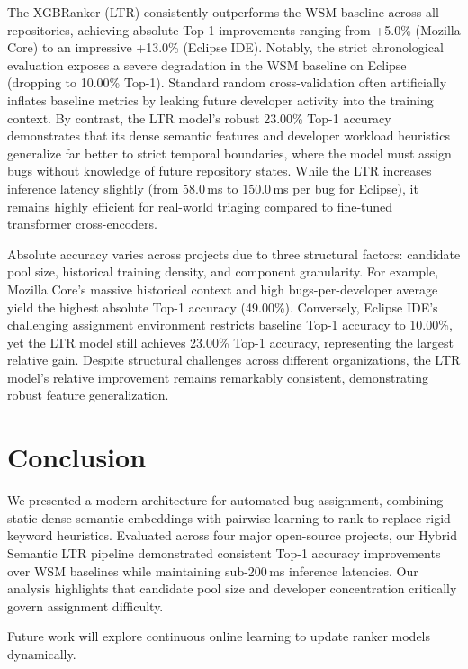 \documentclass[sigconf,review,anonymous]{acmart}
\begin{document}
The XGBRanker (LTR) consistently outperforms the WSM baseline across all repositories, achieving absolute Top-1 improvements ranging from +5.0\% (Mozilla Core) to an impressive +13.0\% (Eclipse IDE). Notably, the strict chronological evaluation exposes a severe degradation in the WSM baseline on Eclipse (dropping to 10.00\% Top-1). Standard random cross-validation often artificially inflates baseline metrics by leaking future developer activity into the training context. By contrast, the LTR model's robust 23.00\% Top-1 accuracy demonstrates that its dense semantic features and developer workload heuristics generalize far better to strict temporal boundaries, where the model must assign bugs without knowledge of future repository states. While the LTR increases inference latency slightly (from 58.0\,ms to 150.0\,ms per bug for Eclipse), it remains highly efficient for real-world triaging compared to fine-tuned transformer cross-encoders.

Absolute accuracy varies across projects due to three structural factors: candidate pool size, historical training density, and component granularity. For example, Mozilla Core's massive historical context and high bugs-per-developer average yield the highest absolute Top-1 accuracy (49.00\%). Conversely, Eclipse IDE's challenging assignment environment restricts baseline Top-1 accuracy to 10.00\%, yet the LTR model still achieves 23.00\% Top-1 accuracy, representing the largest relative gain. Despite structural challenges across different organizations, the LTR model's relative improvement remains remarkably consistent, demonstrating robust feature generalization.

\section{Conclusion}

We presented a modern architecture for automated bug assignment, combining static dense semantic embeddings with pairwise learning-to-rank to replace rigid keyword heuristics. Evaluated across four major open-source projects, our Hybrid Semantic LTR pipeline demonstrated consistent Top-1 accuracy improvements over WSM baselines while maintaining sub-200\,ms inference latencies. Our analysis highlights that candidate pool size and developer concentration critically govern assignment difficulty.

Future work will explore continuous online learning to update ranker models dynamically.



\end{document}
